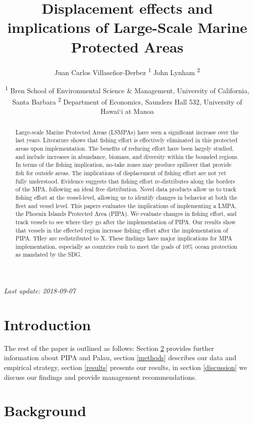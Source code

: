 \documentclass[]{article}
\title{Displacement effects and implications of Large-Scale Marine Protected
Areas}
\author{Juan Carlos Villaseñor-Derbez \textsuperscript{1} John Lynham
\textsuperscript{2}}
\date{\textsuperscript{1} Bren School of Environmental Science \& Management,
University of California, Santa Barbara \textsuperscript{2} Department
of Economics, Saunders Hall 532, University of Hawai`i at Manoa}
\theoremstyle{definition}
\theoremstyle{definition}
\theoremstyle{definition}
\theoremstyle{remark}
\begin{document}
\maketitle
\begin{abstract}
Large-scale Marine Protected Areas (LSMPAs) have seen a significant
increase over the last years. Literature shows that fishing effort is
effectively eliminated in this protected areas upon implementation. The
benefits of reducing effort have been largely studied, and include
increases in abundance, biomass, and diversity within the bounded
regions. In terms of the fishing implication, no-take zones may produce
spillover that provide fish for outside areas. The implications of
displacement of fishing effort are not yet fully understood. Evidence
suggests that fishing effort re-distributes along the borders of the
MPA, following an ideal free distribution. Novel data products allow us
to track fishing effort at the vessel-level, allowing us to identify
changes in behavior at both the fleet and vessel level. This papers
evaluates the implications of implementing a LMPA, the Phoenix Islands
Protected Area (PIPA). We evaluate changes in fishing effort, and track
vessels to see where they go after the implementation of PIPA. Our
results show that vessels in the effected region increase fishing effort
after the implementation of PIPA. THey are redistributed to X. These
findings have major implications for MPA implementation, especially as
countries rush to meet the goals of 10\% ocean protection as mandated by
the SDG.
\end{abstract}

{
\setcounter{tocdepth}{4}
\tableofcontents
}
\emph{Last update: 2018-09-07}

\section{Introduction}\label{introduction}

The rest of the paper is outlined as follows: Section \ref{background}
provides further information about PIPA and Palau, section \ref{methods}
describes our data and empirical strategy, section \ref{results}
presents our results, in section \ref{discussion} we discuss our
findings and provide management recommendations.

\section{Background}\label{background}
\end{document}
